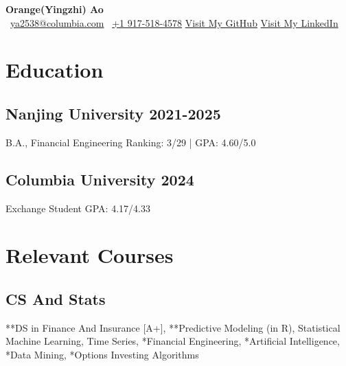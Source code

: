 \documentclass[a4paper]{article}
\newcommand{\org}{\color{org}}
\begin{document}
\fontsize{12pt}{16pt}\selectfont
\begin{center}      
    {\vspace{-10pt}\fontsize{25}{25}\selectfont\bfseries Orange(Yingzhi) Ao} \\ \vspace{12pt}
    {\org\faEnvelope[regular]}\ \href{mailto:ya2538@columbia.edu}{ya2538@columbia.com} \hfill
    {\org{}}\ \href{tel:+1 9175184578}{+1 917-518-4578} \hfill
    {\org\faGithub} \href{https://github.com/OrangeAoo}{Visit My GitHub}  \hfill
    {\org\faLinkedin} \href{http://linkedin.com/in/orange-ao}{Visit My LinkedIn}
\end{center}




\section{Education}  %

\subsection{Nanjing University \normalfont \hfill 2021-2025}
B.A., Financial Engineering \hfill Ranking: 3/29 | GPA: 4.60/5.0

\subsection{Columbia University  \normalfont \hfill 2024}
Exchange Student \hfill GPA: 4.17/4.33

\section{Relevant Courses}
\subsection{CS And Stats}
**DS in Finance And Insurance {\small[A+]}, **Predictive Modeling {\small(in R)}, Statistical Machine Learning, Time Series, *Financial Engineering, *Artificial Intelligence, *Data Mining, *Options Investing Algorithms
\end{document}
